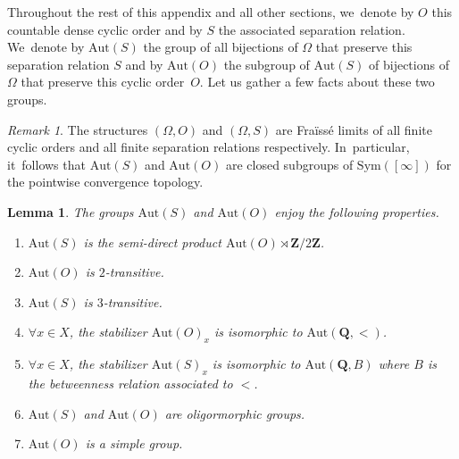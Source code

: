 \documentclass[JEP,XML,SOM,Unicode,NoFloatCountersInSection,published]{cedram}
\theoremstyle{plain}
\newtheorem{lemma}[theorem]{Lemma}
\theoremstyle{definition}
\theoremstyle{remark}
\newtheorem{remark}[theorem]{Remark}
\newcommand{\Aut}{\mathrm{Aut}}
\newcommand{\Sym}{\mathrm{Sym}}
\begin{document}
Throughout the rest of this appendix and all other sections, we~denote by $O$ this countable dense cyclic order and by $S$ the associated separation relation. We~denote by $\Aut(S)$ the group of all bijections of $\Omega$ that preserve this separation relation $S$ and by $\Aut(O)$ the subgroup of $\Aut(S)$ of bijections of $\Omega$ that preserve this cyclic order~$O$.
Let us gather a few facts about these two groups.

\begin{remark}
\label{rmk.Aut.S.C.closed}
The structures $(\Omega,O)$ and $(\Omega,S)$ are Fraïssé limits of all finite cyclic orders and all finite separation relations respectively. In~particular, it~follows that $\Aut(S)$ and $\Aut(O)$ are closed subgroups of $\Sym([\infty])$ for the pointwise convergence topology.
\end{remark}

\begin{lemma}
\label{lem.aut.circular.order.and.relation.properties}
The groups $\Aut(S)$ and $\Aut(O)$ enjoy the following properties.
\begin{enumerate}
\item\label{lem.aut.circular.order.and.relation.properties1} $\Aut(S)$ is the semi-direct product $\Aut(O)\rtimes\mathbf{Z}/2\mathbf{Z}$.
\item\label{lem.aut.circular.order.and.relation.properties2} $\Aut(O)$ is $2$-transitive.
\item\label{lem.aut.circular.order.and.relation.properties3} $\Aut(S)$ is $3$-transitive.
\item\label{lem.aut.circular.order.and.relation.properties4} $\forall x \in X$, the stabilizer $\Aut(O)_x$ is isomorphic to $\Aut(\mathbf{Q},<)$.
\item\label{lem.aut.circular.order.and.relation.properties5} $\forall x \in X$, the stabilizer $\Aut(S)_x$ is isomorphic to $\Aut(\mathbf{Q},B)$ where $B$ is the betweenness relation associated to $<$.
\item\label{lem.aut.circular.order.and.relation.properties7}\label{lem.aut.circular.order.and.relation.properties6} $\Aut(S)$ and $\Aut(O)$ are oligormorphic groups.
\item $\Aut(O)$ is a simple group.
\end{enumerate}
\end{lemma}
\end{document}
